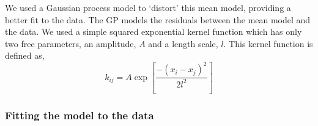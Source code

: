 We used a Gaussian process model to `distort' this mean model, providing a
better fit to the data.
The GP models the residuals between the mean model and the data.
We used a simple squared exponential kernel function which has only two free
parameters, an amplitude, $A$ and a length scale, $l$.
This kernel function is defined as,
\begin{equation}
k_{ij} = A \exp\left[{\frac{-(x_i - x_j)^2}{2l^2}}\right]
\end{equation}


\subsubsection{Fitting the model to the data}

